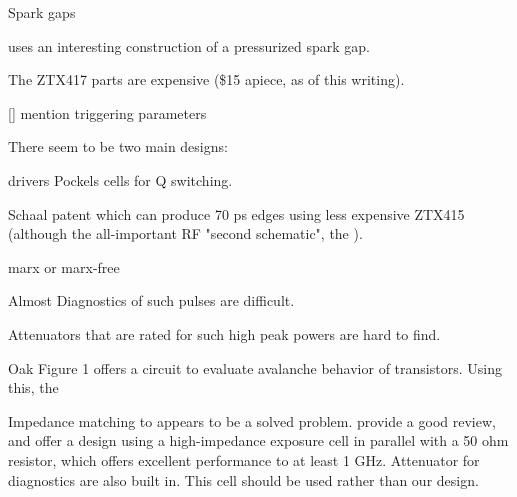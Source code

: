 \documentclass[paper.tex]{subfiles}
\begin{document}
Spark gaps 

\cite{kHz1995} uses an interesting construction of a pressurized spark gap.

The ZTX417 parts are expensive (\$15 apiece, as of this writing). 

[] mention triggering parameters

There seem to be two main designs: 

drivers Pockels cells for Q switching.

Schaal patent  which can produce 70 ps edges using less expensive ZTX415 (although the all-important RF "second schematic", the ).

marx or marx-free



Almost   Diagnostics of such pulses are difficult.

Attenuators that are rated for such high peak powers are hard to find.


Oak \cite{fast1991} Figure 1 offers a circuit to evaluate avalanche behavior of transistors. Using this, the 




Impedance matching to appears to be a solved problem. \cite{Microchamber2011} provide a good review, and offer a design using a high-impedance exposure cell in parallel with a 50 ohm resistor, which offers excellent performance to at least 1 GHz. Attenuator for diagnostics are also built in. This cell should be used rather than our design. \cite{Characterization2012}
\end{document}
